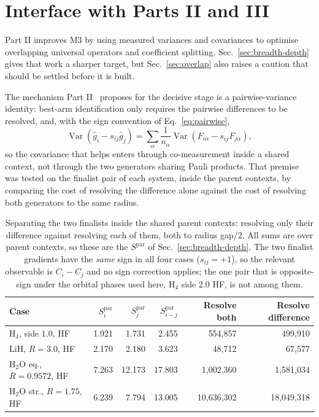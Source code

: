 \documentclass[10pt]{article}
\newcommand{\Var}{\operatorname{Var}}
\begin{document}
\section{Interface with Parts II and III}

Part II improves M3 by using measured variances and covariances to optimise overlapping universal operators and coefficient splitting. Sec.~\ref{sec:breadth-depth} gives that work a sharper target, but Sec.~\ref{sec:overlap} also raises a caution that should be settled before it is built.

The mechanism Part II~\cite{PartII} proposes for the decisive stage is a pairwise-variance identity: best-arm identification only requires the pairwise differences to be resolved, and, with the sign convention of Eq.~\eqref{eq:pairwise},
\begin{equation}
  \Var\!\left(\widehat g_i-s_{ij}\widehat g_j\right)
  =\sum_\alpha\frac{1}{n_\alpha}\Var\!\left(F_{i\alpha}-s_{ij}F_{j\alpha}\right),
\end{equation}
so the covariance that helps enters through co-measurement inside a shared context, not through the two generators sharing Pauli products. That premise was tested on the finalist pair of each system, inside the parent contexts, by comparing the cost of resolving the difference alone against the cost of resolving both generators to the same radius.

\begin{table}[!htbp]
\centering
\scriptsize
\caption{Separating the two finalists inside the shared parent contexts: resolving only their difference against resolving each of them, both to radius gap/2. All sums are over parent contexts, so these are the $S^{\text{par}}$ of Sec.~\ref{sec:breadth-depth}. The two finalist gradients have the \emph{same} sign in all four cases ($s_{ij}=+1$), so the relevant observable is $C_i-C_j$ and no sign correction applies; the one pair that is opposite-sign under the orbital phases used here, H$_4$ side $2.0$ HF, is not among them.}
\label{tab:difference}
\begin{tabular}{lrrrrr}
\toprule
Case & $S^{\text{par}}_i$ & $S^{\text{par}}_j$ & $S^{\text{par}}_{i-j}$ & Resolve both & Resolve difference \\
\midrule
H$_4$, side $1.0$, HF & 1.921 & 1.731 & 2.455 & 554,857 & 499,910 \\
LiH, $R{=}3.0$, HF & 2.170 & 2.180 & 3.623 & 48,712 & 67,577 \\
H$_2$O eq., $R{=}0.9572$, HF & 7.263 & 12.173 & 17.803 & 1,002,360 & 1,581,034 \\
H$_2$O str., $R{=}1.75$, HF & 6.239 & 7.794 & 13.005 & 10,636,302 & 18,049,318 \\
\bottomrule
\end{tabular}
\end{table}
\end{document}
